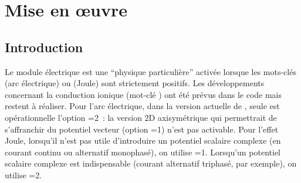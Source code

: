 %
% 
%
% 
% 
% 
%
%
\section{Mise en \oe uvre}
 

\subsection{Introduction} 

Le module \'electrique est une ``physique particuli\`ere'' activ\'ee lorsque les
mots-cl\'es  (arc \'electrique) ou 
(Joule) sont strictement positifs. Les d\'eveloppements concernant la conduction ionique
(mot-cl\'e ) ont \'et\'e pr\'evus dans le code mais restent \`a
r\'ealiser. Pour l'arc \'electrique, dans la version actuelle
de \CS, seule est op\'erationnelle l'option =2~: la version 2D axisym\'etrique qui permettrait de
	s'affranchir du potentiel vecteur (option =1) n'est pas
	activable. 
Pour l'effet Joule, lorsqu'il n'est pas utile d'introduire un potentiel scalaire
complexe
(en courant continu ou alternatif monophas\'e), on utilise
=1. Lorsqu'un potentiel scalaire complexe est indispensable (courant
alternatif triphas\'e, par exemple), on utilise
=2.

